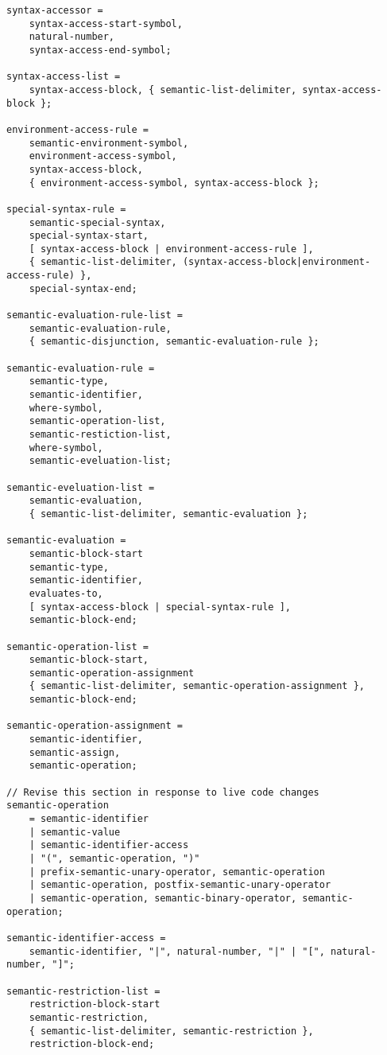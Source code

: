 \begin{verbatim}
syntax-accessor = 
    syntax-access-start-symbol,
    natural-number,
    syntax-access-end-symbol;

syntax-access-list = 
    syntax-access-block, { semantic-list-delimiter, syntax-access-block };

environment-access-rule = 
    semantic-environment-symbol,
    environment-access-symbol,
    syntax-access-block,
    { environment-access-symbol, syntax-access-block };

special-syntax-rule = 
    semantic-special-syntax,
    special-syntax-start,
    [ syntax-access-block | environment-access-rule ],
    { semantic-list-delimiter, (syntax-access-block|environment-access-rule) },
    special-syntax-end;

semantic-evaluation-rule-list = 
    semantic-evaluation-rule,
    { semantic-disjunction, semantic-evaluation-rule };

semantic-evaluation-rule = 
    semantic-type,
    semantic-identifier,
    where-symbol,
    semantic-operation-list,
    semantic-restiction-list,
    where-symbol, 
    semantic-eveluation-list;

semantic-eveluation-list = 
    semantic-evaluation,
    { semantic-list-delimiter, semantic-evaluation };

semantic-evaluation = 
    semantic-block-start
    semantic-type, 
    semantic-identifier,
    evaluates-to,
    [ syntax-access-block | special-syntax-rule ],
    semantic-block-end;

semantic-operation-list = 
    semantic-block-start,
    semantic-operation-assignment
    { semantic-list-delimiter, semantic-operation-assignment },
    semantic-block-end;

semantic-operation-assignment =
    semantic-identifier,
    semantic-assign,
    semantic-operation;

// Revise this section in response to live code changes
semantic-operation 
    = semantic-identifier
    | semantic-value
    | semantic-identifier-access
    | "(", semantic-operation, ")"
    | prefix-semantic-unary-operator, semantic-operation
    | semantic-operation, postfix-semantic-unary-operator
    | semantic-operation, semantic-binary-operator, semantic-operation;

semantic-identifier-access = 
    semantic-identifier, "|", natural-number, "|" | "[", natural-number, "]";

semantic-restriction-list = 
    restriction-block-start
    semantic-restriction,
    { semantic-list-delimiter, semantic-restriction },
    restriction-block-end;


\end{verbatim}
